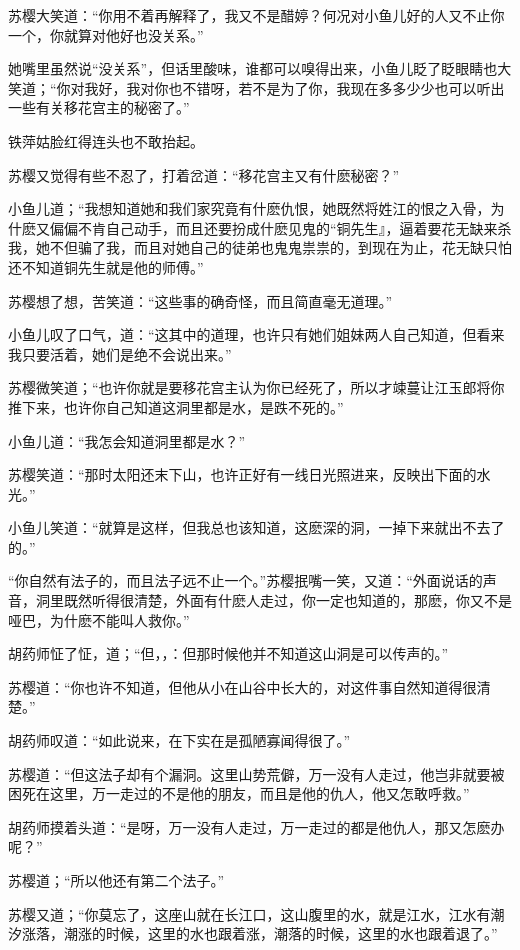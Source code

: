 \documentclass[12pt,oneside]{book}
\begin{document}
苏樱大笑道：``你用不着再解释了，我又不是醋婷？何况对小鱼儿好的人又不止你一个，你就算对他好也没关系。''

她嘴里虽然说``没关系''，但话里酸味，谁都可以嗅得出来，小鱼儿眨了眨眼睛也大笑道；``你对我好，我对你也不错呀，若不是为了你，我现在多多少少也可以听出一些有关移花宫主的秘密了。''

铁萍姑脸红得连头也不敢抬起。

苏樱又觉得有些不忍了，打着岔道：``移花宫主又有什麽秘密？''

小鱼儿道；``我想知道她和我们家究竟有什麽仇恨，她既然将姓江的恨之入骨，为什麽又偏偏不肯自己动手，而且还要扮成什麽见鬼的``铜先生』，逼着要花无缺来杀我，她不但骗了我，而且对她自己的徒弟也鬼鬼祟祟的，到现在为止，花无缺只怕还不知道铜先生就是他的师傅。''

苏樱想了想，苦笑道：``这些事的确奇怪，而且简直毫无道理。''

小鱼儿叹了口气，道：``这其中的道理，也许只有她们姐妹两人自己知道，但看来我只要活着，她们是绝不会说出来。''

苏樱微笑道；``也许你就是要移花宫主认为你已经死了，所以才竦蔓让江玉郎将你推下来，也许你自己知道这洞里都是水，是跌不死的。''

小鱼儿道：``我怎会知道洞里都是水？''

苏樱笑道：``那时太阳还末下山，也许正好有一线日光照进来，反映出下面的水光。''

小鱼儿笑道：``就算是这样，但我总也该知道，这麽深的洞，一掉下来就出不去了的。''

``你自然有法子的，而且法子远不止一个。''苏樱抿嘴一笑，又道：``外面说话的声音，洞里既然听得很清楚，外面有什麽人走过，你一定也知道的，那麽，你又不是哑巴，为什麽不能叫人救你。''

胡药师怔了怔，道；``但，，：但那时候他并不知道这山洞是可以传声的。''

苏樱道：``你也许不知道，但他从小在山谷中长大的，对这件事自然知道得很清楚。''

胡药师叹道：``如此说来，在下实在是孤陋寡闻得很了。''

苏樱道：``但这法子却有个漏洞。这里山势荒僻，万一没有人走过，他岂非就要被困死在这里，万一走过的不是他的朋友，而且是他的仇人，他又怎敢呼救。''

胡药师摸着头道：``是呀，万一没有人走过，万一走过的都是他仇人，那又怎麽办呢？''

苏樱道；``所以他还有第二个法子。''

苏樱又道；``你莫忘了，这座山就在长江口，这山腹里的水，就是江水，江水有潮汐涨落，潮涨的时候，这里的水也跟着涨，潮落的时候，这里的水也跟着退了。''
\end{document}
